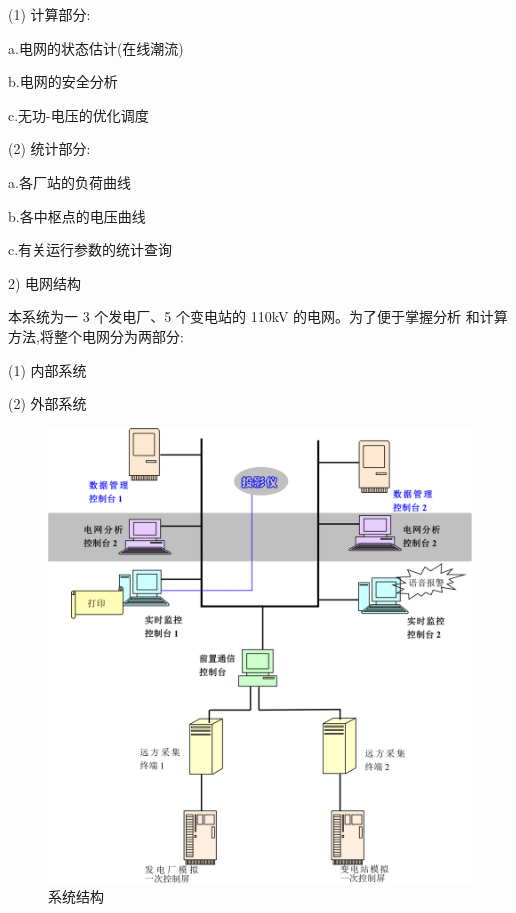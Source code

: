 \documentclass[a4paper]{ctexrep}
\begin{document}
                \quad (1) 计算部分:

                \qquad a.电网的状态估计(在线潮流)

                \qquad b.电网的安全分析

                \qquad c.无功-电压的优化调度

                \quad (2) 统计部分:

                \qquad a.各厂站的负荷曲线

                \qquad b.各中枢点的电压曲线

                \qquad c.有关运行参数的统计查询

                2) 电网结构

                本系统为一 3 个发电厂、5 个变电站的 110kV 的电网。为了便于掌握分析
                和计算方法,将整个电网分为两部分:

                \quad (1) 内部系统

                \quad (2) 外部系统

                \begin{figure}[htbp]
                    \centering
                    \includegraphics[width=14cm]{1.pdf}
                    \caption{系统结构}
                \end{figure}
            
\end{document}
